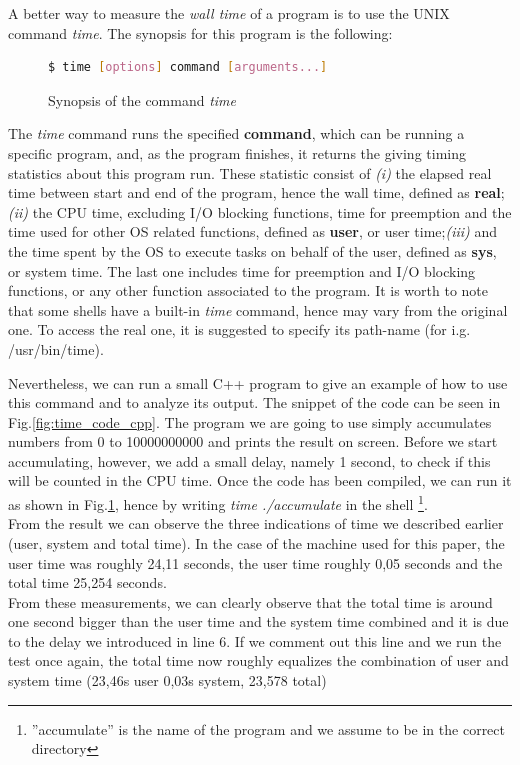 A better way to measure the \textit{wall time} of a program is to use the UNIX command \textit{time}. The synopsis for this program is the following: \cite{linux_commands}\\
\begin{figure}[h]
\begin{lstlisting}[language=bash]
   $ time [options] command [arguments...]
\end{lstlisting}
\caption{Synopsis of the command \textit{time}}
\label{fig:time_code}
\end{figure}
The \textit{time} command runs the specified \textbf{command}, which can be running a specific program, and, as the program finishes, it returns the giving timing statistics about this program run.
These statistic consist of \textit{(i)} the elapsed real time between start and end of the program, hence the wall time, defined as \textbf{real}; \textit{(ii)} the CPU time, excluding I/O blocking functions, time for preemption and the time used for other OS related functions, defined as \textbf{user}, or user time;\textit{(iii)} and the time spent by the OS to execute tasks on behalf of the user, defined as \textbf{sys}, or system time. The last one includes time for preemption and I/O blocking functions, or any other function associated to the program. \cite{Stewart2001MeasuringET}
It is worth to note that some shells have a built-in \textit{time} command, hence may vary from the original one. To access the real one, it is suggested to specify its path-name (for i.g. /usr/bin/time).\cite{linux_commands} 

Nevertheless, we can run a small C++ program to give an example of how to use this command and to analyze its output. The snippet of the code can be seen in Fig.\ref{fig:time_code_cpp}. The program we are going to use simply accumulates numbers from 0  to 10000000000 and prints the result on screen. Before we start accumulating, however, we add a small delay, namely 1 second, to check if this will be counted in the CPU time. Once the code has been compiled, we can run it as shown in Fig.\ref{fig:time_code}, hence by writing \textit{time ./accumulate} in the shell \footnote{''accumulate'' is the name of the program and we assume to be in the correct directory}.\\
From the result we can observe the three indications of time we described earlier (user, system and total time).  In the case of the machine used for this paper, the user time was roughly 24,11 seconds, the user time roughly 0,05 seconds and the total time 25,254 seconds. \\
From these measurements, we can clearly observe that the total time is around one second bigger than the user time and the system time combined and it is due to the delay we introduced in line 6. If we comment out this line and we run the test once again, the total time now roughly equalizes the combination of user and system time (23,46s user 0,03s system, 23,578 total)


